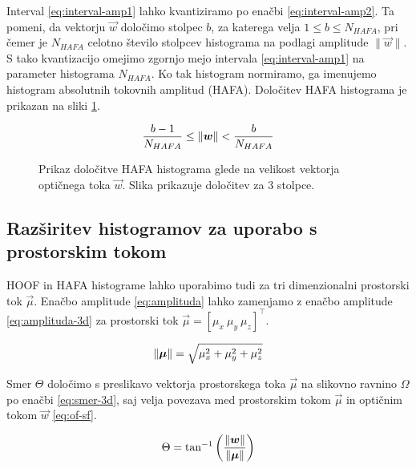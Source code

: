 Interval \eqref{eq:interval-amp1} lahko kvantiziramo po enačbi \eqref{eq:interval-amp2}. Ta pomeni, da vektorju $\vec{w}$ določimo stolpec $b$, za katerega velja $1 \leq b \leq N_{HAFA}$, pri čemer je $N_{HAFA}$ celotno število stolpcev histograma na podlagi amplitude $\| \vec{w} \|$. S tako kvantizacijo omejimo zgornjo mejo intervala \eqref{eq:interval-amp1} na parameter histograma $N_{HAFA}$. Ko tak histogram normiramo, ga imenujemo histogram absolutnih tokovnih amplitud (HAFA). Določitev HAFA histograma je prikazan na sliki \ref{fig:hafa-histogram}.

\begin{equation}\label{eq:interval-amp2}
	\frac{b-1}{N_{HAFA}} \leq \left\lVert {\boldsymbol{w}} \right\rVert < \frac{b}{N_{HAFA}}
\end{equation}




\begin{figure}[!htb]
\centering
\resizebox{0.5\columnwidth}{!}{}
\caption[Prikaz določitve HAFA histograma glede na velikost vektorja]{Prikaz določitve HAFA histograma glede na velikost vektorja optičnega toka $\vec{w}$. Slika prikazuje določitev za $3$ stolpce.}
\label{fig:hafa-histogram}
\end{figure}



\subsection{Razširitev histogramov za uporabo s prostorskim tokom}
HOOF in HAFA histograme lahko uporabimo tudi za tri dimenzionalni prostorski tok $\vec{\mu}$. Enačbo amplitude \eqref{eq:amplituda} lahko zamenjamo z enačbo amplitude \eqref{eq:amplituda-3d} za prostorski tok $\vec{\mu} = \left[\mu_x~\mu_y~\mu_z \right]^\top$.

\begin{equation}
\left\lVert {\boldsymbol{\mu}} \right\rVert = \sqrt{\mu_x^2 + \mu_y^2 + \mu_z^2} 
\label{eq:amplituda-3d}
\end{equation}

Smer $\Theta$ določimo s preslikavo vektorja prostorskega toka $\vec{\mu}$ na slikovno ravnino $\mathit{\Omega}$ po enačbi \eqref{eq:smer-3d}, saj velja povezava med prostorskim tokom $\vec{\mu}$ in optičnim tokom $\vec{w}$ \eqref{eq:of-sf}.


\begin{equation}
\Theta = \tan^{-1}\left( \frac{\left\lVert {\boldsymbol{w}} \right\rVert}{\left\lVert {\boldsymbol{\mu}} \right\rVert} \right)
\label{eq:smer-3d}
\end{equation}

